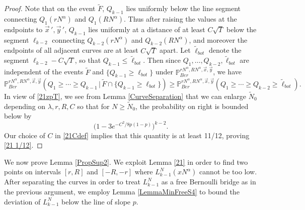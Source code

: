 \begin{proof}
		Note that on the event $\tilde F$, $Q_{k-1}$ lies uniformly below the line segment connecting $Q_1(rN^\alpha)$ and $Q_1(RN^\alpha)$. Thus after raising the values at the endpoints to $\vec{x}\,',\vec{y}\,'$, $Q_{k-1}$ lies uniformly at a distance of at least $C\sqrt{T}$ below the segment $\ell_{k-2}$ connecting $Q_{k-2}(rN^\alpha)$ and $Q_{k-2}(RN^\alpha)$, and moreover the endpoints of all adjacent curves are at least $C\sqrt{T}$ apart. Let $\tilde{\ell}_{bot}$ denote the segment $\ell_{k-2} - C\sqrt{T}$, so that $Q_{k-1} \leq \tilde\ell_{bot}$. Then since $Q_1,\dots,Q_{k-2},\tilde \ell_{bot}$ are independent of the events $\tilde F$ and $\{Q_{k-1} \geq \ell_{bot}\}$ under $\mathbb{P}^{rN^\alpha, RN^\alpha,\vec{x},\vec{y}}_{Ber}$, we have 
		\[
		\mathbb{P}^{rN^\alpha, RN^\alpha,\vec{x},\vec{y}}_{Ber} \left(Q_1 \geq \cdots \geq Q_{k-1}\,\big|\,\tilde F\cap \{ Q_{k-1} \geq \ell_{bot}\}\right) \geq \mathbb{P}^{rN^\alpha, RN^\alpha,\vec{x},\vec{y}}_{Ber} \left(Q_1 \geq \cdots \geq Q_{k-2} \geq \tilde \ell_{bot}\right).
		\]
		In view of \eqref{21zpT}, we see from Lemma \ref{CurveSeparation} that we can enlarge $\tilde{N}_0$ depending on $\lambda, r, R, C$ so that for $N\geq\tilde{N}_0$, the probability on right is bounded below by
		\[
		\big(1-3e^{-C^2/8p(1-p)}\big)^{k-2}.
		\]
		Our choice of $C$ in \eqref{21Cdef} implies that this quantity is at least 11/12, proving \eqref{21 1/12}.
		
	\end{proof}

	We now prove Lemma \ref{PropSup2}. We exploit Lemma \ref{21} in order to find two points on intervals $[r,R]$ and $[-R,-r]$ where $L_{k-1}^N(xN^\alpha)$ cannot be too low. After separating the curves in order to treat $L_{k-1}^N$ as a free Bernoulli bridge as in the previous argument, we employ Lemma \ref{LemmaMinFreeS4} to bound the deviation of $L_{k-1}^N$ below the line of slope $p$.
	
